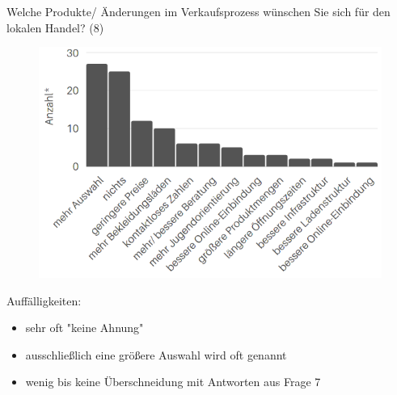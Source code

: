 \newpage\noindent Welche Produkte/ Änderungen im Verkaufsprozess wünschen Sie sich für den lokalen Handel? (8)\\
\vfill
\begin{figure}[H]
    \begin{center}
        \includegraphics[width=12cm]{media/schuelerumfrage/8.png}
    \end{center} 
\end{figure}
\vfill\vfill
\noindent Auffälligkeiten:
\begin{itemize}
 \item sehr oft "keine Ahnung"
 \item ausschließlich eine größere Auswahl wird oft genannt
 \item wenig bis keine Überschneidung mit Antworten aus Frage 7
 \end{itemize}
\vfill\vfill\vfill\vfill

